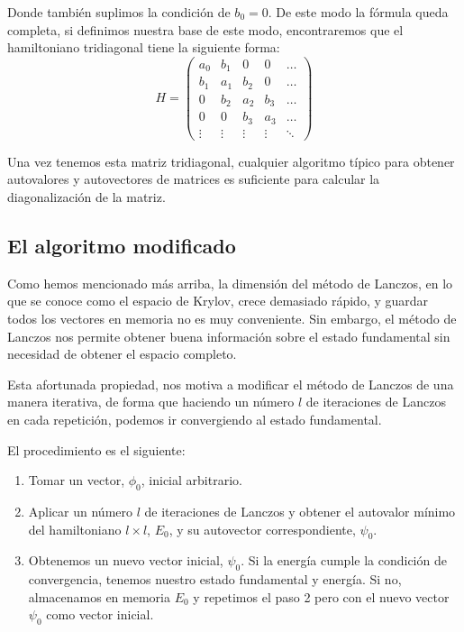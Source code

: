 \documentclass[12pt,twoside]{article}
\begin{document}
Donde también suplimos la condición de $b_0 = 0$. De este modo la fórmula queda completa, si definimos nuestra base de este modo, encontraremos que el hamiltoniano tridiagonal tiene la siguiente forma:
\begin{equation}
    H = \left(\begin{array}{ccccc}
        a_0 & b_1 & 0 & 0 & \ldots \\
        b_1 & a_1 & b_2 & 0 & \ldots \\
        0 & b_2 & a_2 & b_3 & \ldots \\
        0 & 0 & b_3 & a_3 & \ldots \\
        \vdots & \vdots & \vdots & \vdots & \ddots
    \end{array}\right)
\end{equation}

Una vez tenemos esta matriz tridiagonal, cualquier algoritmo típico para obtener autovalores y autovectores de matrices es suficiente para calcular la diagonalización de la matriz.
\subsection{El algoritmo modificado}

Como hemos mencionado más arriba, la dimensión del método de Lanczos, en lo que se conoce como el espacio de Krylov, crece demasiado rápido, y guardar todos los vectores en memoria no es muy conveniente. Sin embargo, el método de Lanczos nos permite obtener buena información sobre el estado fundamental sin necesidad de obtener el espacio completo.

Esta afortunada propiedad, nos motiva a modificar el método de Lanczos de una manera iterativa, de forma que haciendo un número $l$ de iteraciones de Lanczos en cada repetición, podemos ir convergiendo al estado fundamental.

El procedimiento es el siguiente:
\begin{enumerate}
  \item Tomar un vector, $\phi_0$, inicial arbitrario.
  \item Aplicar un número $l$ de iteraciones de Lanczos y obtener el autovalor mínimo del hamiltoniano $l \times l$, $E_0$, y su autovector correspondiente, $\psi_0$.
  \item Obtenemos un nuevo vector inicial, $\psi_0$. Si la energía cumple la condición de convergencia, tenemos nuestro estado fundamental y energía. Si no, almacenamos en memoria $E_0$ y repetimos el paso 2 pero con el nuevo vector $\psi_0$ como vector inicial.
\end{enumerate}
\end{document}
